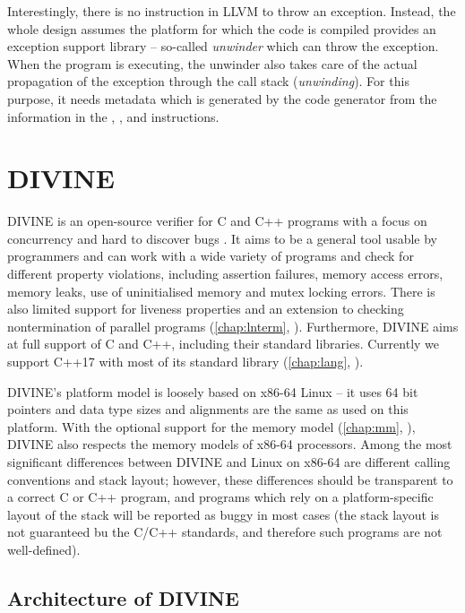 Interestingly, there is no instruction in LLVM to throw an exception.
Instead, the whole design assumes the platform for
which the code is compiled provides an exception support library -- so-called
\emph{unwinder} which can throw the exception.
When the program is executing, the unwinder also takes care of the actual
propagation of the exception through the call stack (\emph{unwinding}).
For this purpose, it needs metadata which is generated by the code generator
from the information in the , , and 
instructions.

\section{DIVINE}

DIVINE is an open-source verifier for C and C++ programs with a focus on
concurrency and hard to discover bugs .
It aims to be a general tool usable by programmers and can work with a wide
variety of programs and check for different property violations, including
assertion failures, memory access errors, memory leaks, use of uninitialised
memory and mutex locking errors.
There is also limited support for liveness properties and an extension to
checking nontermination of parallel programs (\autoref{chap:lnterm},
).
Furthermore, DIVINE aims at full support of C and C++, including their standard
libraries.
Currently we support C++17 with most of its standard library
(\autoref{chap:lang}, ).

DIVINE's platform model is loosely based on x86-64 Linux -- it uses 64
bit pointers and data type sizes and alignments are the same as used on this
platform.
With the optional support for the \xtso memory model (\autoref{chap:mm},
), DIVINE also respects the memory models of x86-64
processors.
Among the most significant differences between DIVINE and Linux on x86-64 are different
calling conventions and stack layout; however, these differences should be
transparent to a correct C or C++ program, and programs which rely on
a platform-specific layout of the stack will be reported as buggy in most cases
(the stack layout is not guaranteed bu the C/C++ standards, and therefore such
programs are not well-defined).

\subsection{Architecture of DIVINE}

